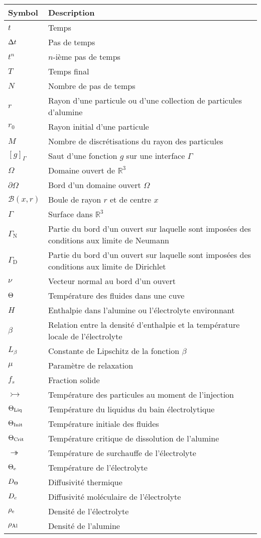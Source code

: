 \begin{tabularx}{\textwidth}{@{}ll@{}}
  \toprule
  Symbol & Description \\
  \midrule
  $t$ & Temps \\
  $\Delta t$ & Pas de temps \\
  $t^n$ & $n$-ième pas de temps\\
  $T$ & Temps final \\
  $N$ & Nombre de pas de temps \\
  $r$ & Rayon d'une particule ou d'une collection de particules d'alumine \\
  $r_0$ & Rayon initial d'une particule \\
  $M$ & Nombre de discrétisations du rayon des particules \\
  $ [g]_\Gamma $ & Saut d'une fonction $g$ sur une interface $\Gamma$\\
  $\Omega$ & Domaine ouvert de $\mathbb R^3$ \\
  $\partial\Omega$ & Bord d'un domaine ouvert $\Omega$\\
  $\mathcal B(x, r)$ & Boule de rayon $r$ et de centre $x$\\
  $\Gamma$ & Surface dans $\mathbb R^3$\\
  $\Gamma_\mathrm{N}$ & Partie du bord d'un ouvert sur laquelle sont imposées des conditions aux limite de Neumann\\
  $\Gamma_\mathrm{D}$ & Partie du bord d'un ouvert sur laquelle sont imposées des conditions aux limite de Dirichlet\\
  $\nu$ & Vecteur normal au bord d'un ouvert\\
  $\Theta$ & Température des fluides dans une cuve\\
  $H$ & Enthalpie dans l'alumine ou l'électrolyte environnant \\
  $\beta$ & Relation entre la densité d'enthalpie et la température locale de l'électrolyte\\
  $L_\beta$ & Constante de Lipschitz de la fonction $\beta$ \\
  $\mu$ & Paramètre de relaxation \\
  $f_s$ & Fraction solide \\
  $\tinj$ & Température des particules au moment de l'injection\\
  $\Theta_\text{Liq}$ & Température du liquidus du bain électrolytique \\
  $\Theta_\text{Init}$ & Température initiale des fluides\\
  $\Theta_\text{Crit}$ & Température critique de dissolution de l'alumine\\
  $\tsur$ & Température de surchauffe de l'électrolyte\\
  $\Theta_\mathrm{e}$ & Température de l'électrolyte\\
  $D_\Theta$ & Diffusivité thermique\\
  $D_c$ & Diffusivité moléculaire de l'électrolyte\\
  ${\rho_\text{e}}$ & Densité de l'électrolyte\\
  ${\rho_\text{Al}}$ & Densité de l'alumine\\
  \bottomrule
\end{tabularx}



